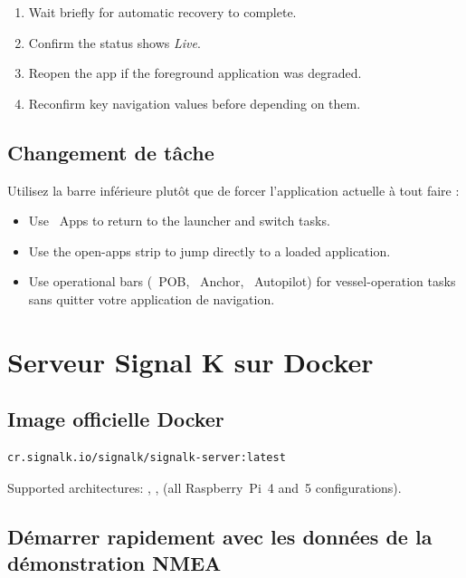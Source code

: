 \begin{enumerate}
  \item Wait briefly for automatic recovery to complete.
  \item Confirm the status shows \textit{Live}.
  \item Reopen the app if the foreground application was degraded.
  \item Reconfirm key navigation values before depending on them.
\end{enumerate}

\section{Changement de tâche}

Utilisez la barre inférieure plutôt que de forcer l'application actuelle à tout faire :

\begin{itemize}
  \item Use ~Apps to return to the launcher and switch tasks.
  \item Use the open-apps strip to jump directly to a loaded application.
  \item Use operational bars (~POB, ~Anchor,
        ~Autopilot) for vessel-operation tasks
sans quitter votre application de navigation.
\end{itemize}

\chapter{Serveur Signal K sur Docker}
\label{ch:docker}

\section{Image officielle Docker}

\begin{lstlisting}
cr.signalk.io/signalk/signalk-server:latest
\end{lstlisting}

Supported architectures: , ,
 (all Raspberry~Pi~4 and~5 configurations).

\section{Démarrer rapidement avec les données de la démonstration NMEA}

